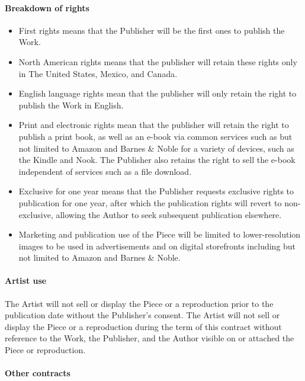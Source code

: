 \documentclass[12pt,letterpaper]{article}
\begin{document}
\paragraph{Breakdown of rights}

\begin{itemize}
    \item First rights means that the Publisher will be the first ones to publish the Work.
    \item North American rights means that the publisher will retain these rights only in The United States, Mexico, and Canada.
    \item English language rights mean that the publisher will only retain the right to publish the Work in English.
    \item Print and electronic rights mean that the publisher will retain the right to publish a print book, as well as an e-book via common services such as but not limited to Amazon and Barnes \& Noble for a variety of devices, such as the Kindle and Nook. The Publisher also retains the right to sell the e-book independent of services such as a file download.
    \item Exclusive for one year means that the Publisher requests exclusive rights to publication for one year, after which the publication rights will revert to non-exclusive, allowing the Author to seek subsequent publication elsewhere.
    \item Marketing and publication use of the Piece will be limited to lower-resolution images to be used in advertisements and on digital storefronts including but not limited to Amazon and Barnes \& Noble.
\end{itemize}

\paragraph{Artist use}

The Artist will not sell or display the Piece or a reproduction prior to the publication date without the Publisher's consent. The Artist will not sell or display the Piece or a reproduction during the term of this contract without reference to the Work, the Publisher, and the Author visible on or attached the Piece or reproduction.

\paragraph{Other contracts}
\end{document}

